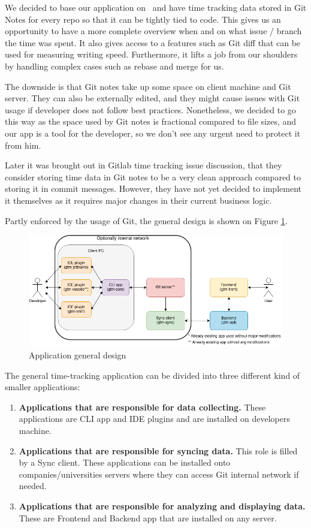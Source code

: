 We decided to base our application on~ and have time tracking data stored in Git Notes
for every repo so that it can be tightly tied to code.
This gives us an opportunity to have a more complete overview when and on what issue / branch the time was spent.
It also gives access to a features such as Git diff that can be used for measuring writing speed.
Furthermore, it lifts a job from our shoulders by handling complex cases such as rebase and merge for us.

The downside is that Git notes take up some space on client machine and Git server.
They can also be externally edited, and they might cause issues with Git usage if developer does not follow best practices.
Nonetheless, we decided to go this way as the space used by Git notes is fractional compared to file sizes, and our app is a tool for the developer,
so we don't see any urgent need to protect it from him.

Later it was brought out in Gitlab time tracking issue discussion, that they consider storing time data in Git notes
to be a very clean approach compared to storing it in commit messages.
However, they have not yet decided to implement it themselves as it requires major changes in their current business logic.
\cite{gitlab-time-issue}

Partly enforced by the usage of Git, the general design is shown on Figure
\ref{fig:project-archidecture}.

\begin{figure}[h]
    \includegraphics[width=\textwidth]{figures/project_archidecture}
    \caption{Application general design}
    \label{fig:project-archidecture}
\end{figure}

The general time-tracking application can be divided into three different kind of smaller applications:
\begin{enumerate}
    \item \textbf{Applications that are responsible for data collecting.} These applications are CLI app and IDE plugins and are installed on developers machine.
    \item \textbf{Applications that are responsible for syncing data.} This role is filled by a Sync client.
    These applications can be installed onto companies/universities servers where they can access Git internal network if needed.
    \item \textbf{Applications that are responsible for analyzing and displaying data.} These are Frontend and Backend app that are installed on any server.
\end{enumerate}

